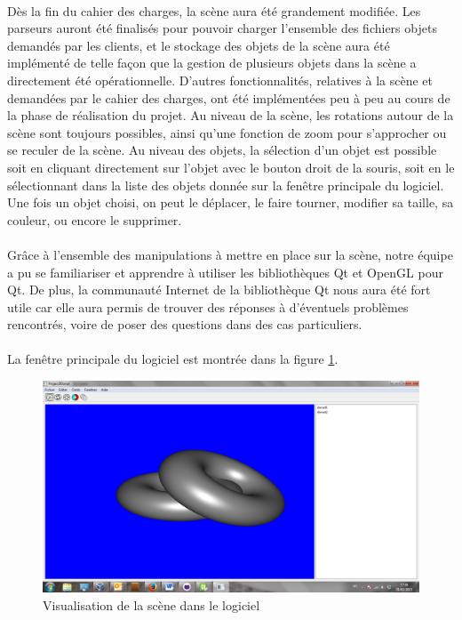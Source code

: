 \paragraph{}
Dès la fin du cahier des charges, la scène aura été grandement modifiée. Les parseurs auront été finalisés pour pouvoir charger l'ensemble des fichiers objets demandés par les clients, et le stockage des objets de la scène aura été implémenté de telle façon que la gestion de plusieurs objets dans la scène a directement été opérationnelle. D'autres fonctionnalités, relatives à la scène et demandées par le cahier des charges, ont été implémentées peu à peu au cours de la phase de réalisation du projet. Au niveau de la scène, les rotations autour de la scène sont toujours possibles, ainsi qu'une fonction de zoom pour s'approcher ou se reculer de la scène. Au niveau des objets, la sélection d'un objet est possible soit en cliquant directement sur l'objet avec le bouton droit de la souris, soit en le sélectionnant dans la liste des objets donnée sur la fenêtre principale du logiciel. Une fois un objet choisi, on peut le déplacer, le faire tourner, modifier sa taille, sa couleur, ou encore le supprimer.

\paragraph{}
Grâce à l'ensemble des manipulations à mettre en place sur la scène, notre équipe a pu se familiariser et apprendre à utiliser les bibliothèques Qt et OpenGL pour Qt. De plus, la communauté Internet de la bibliothèque Qt nous aura été fort utile car elle aura permis de trouver des réponses à d'éventuels problèmes rencontrés, voire de poser des questions dans des cas particuliers.

\paragraph{}
La fenêtre principale du logiciel est montrée dans la figure \ref{fig:screenScene}.

\begin{figure}[h]
	\centering
	\includegraphics[scale=0.3]{Scene.png}
	\caption{\label{fig:screenScene} Visualisation de la scène dans le logiciel \protect}
\end{figure}

